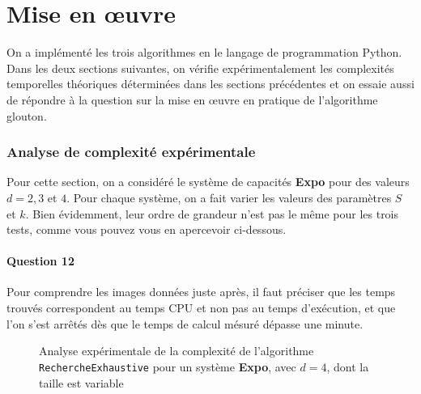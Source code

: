 \documentclass[12pt,a4paper]{article}
\begin{document}
 \newpage
 \part{Mise en \oe uvre}
 On a impl\'ement\'e les trois algorithmes en le langage de programmation Python. Dans les deux sections suivantes, on v\'erifie exp\'erimentalement les complexit\'es temporelles th\'eoriques d\'etermin\'ees dans les sections pr\'ec\'edentes et on essaie aussi de r\'epondre \`a la question sur la mise en \oe uvre en pratique de l'algorithme glouton.

 \section{Analyse de complexit\'e exp\'erimentale}
 Pour cette section, on a consid\'er\'e le syst\`eme de capacit\'es {\bfseries Expo} pour des valeurs $d = 2, 3$ et $4$. Pour chaque syst\`eme, on a fait varier les valeurs des param\`etres $S$ et $k$. Bien \'evidemment, leur ordre de grandeur n'est pas le m\^eme pour les trois tests, comme vous pouvez vous en apercevoir ci-dessous.

 \subsection*{Question 12}
 Pour comprendre les images donn\'ees juste apr\`es, il faut pr\'eciser que les temps trouv\'es correspondent au temps CPU et non pas au temps d'ex\'ecution, et que l'on s'est arr\^et\'es d\`es que le temps de calcul m\'esur\'e d\'epasse une minute.
 
\begin{figure}[!h]
  \centering
  \captionsetup{justification=centering}
  \caption[Analyse exp\'erimentale de \texttt{RechercheExhaustive}]{Analyse exp\'erimentale de la complexit\'e de l'algorithme \texttt{RechercheExhaustive} pour un syst\`eme {\bfseries Expo}, avec $d=4$, dont la taille est variable}
  \label{fig:comp_es}
\end{figure}
\end{document}
